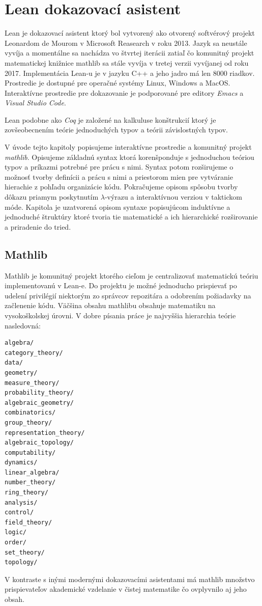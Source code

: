\documentclass[a4paper,10pt,oneside]{report}%
\begin{document}
\chapter{Lean dokazovací asistent}
    Lean je dokazovací asistent ktorý bol vytvorený ako otvorený softvérový projekt
Leonardom de Mourom v Microsoft Reasearch v roku 2013.
    Jazyk sa neustále vyvíja a momentálne sa nachádza vo štvrtej iterácii \cite{lean4}
zatiaľ čo komunitný projekt matematickej knižnice mathlib sa stále vyvíja v tretej
    verzii \cite{lean3} vyvíjanej od roku 2017.
    Implementácia Lean-u je v jazyku C++ a jeho jadro má len 8000 riadkov.
    Prostredie je dostupné pre operačné systémy Linux, Windows a MacOS.
    Interaktívne prostredie pre dokazovanie je podporované pre editory \emph{Emacs} a \emph{Visual Studio Code}.

    Lean podobne ako \emph{Coq} je založené na kalkuluse konštrukcií ktorý je zovšeobecnením 
teórie jednoduchých typov a teórii závislostných typov.

    V úvode tejto kapitoly popisujeme interaktívne prostredie a komunitný projekt
\emph{mathlib}. Opisujeme základnú syntax ktorá korenšponduje s jednoduchou teóriou
typov a príkazmi potrebné pre prácu s nimi. Syntax potom rozširujeme o možnosť
tvorby definícii a prácu s nimi a priestorom mien pre vytváranie hierachie z pohľadu
organizácie kódu.
    Pokračujeme opisom spôsobu tvorby dôkazu priamym poskytnutím $\lambda$-výrazu
a interaktívnou verziou v taktickom móde.
    Kapitola je uzatvorená opisom syntaxe popisujúcom induktívne a jednoduché
štruktúry ktoré tvoria tie matematické a ich hierarchické rozširovanie a priradenie
do tried.

\section{Mathlib}
    Mathlib je komunitný projekt \cite{mathlib} ktorého cieľom je centralizovať
matematickú teóriu implementovanú v Lean-e.
    Do projektu je možné jednoducho prispievať po udelení privilégií niektorým zo
správcov repozitára a odobrením požiadavky na začlenenie kódu.
    Väčšina obsahu mathlibu obsahuje matematiku na vysokoškolskej úrovni.
    V dobre písania práce je najvyššia hierarchia teórie nasledovná:
\begin{lstlisting}
algebra/
category_theory/
data/
geometry/
measure_theory/
probability_theory/
algebraic_geometry/
combinatorics/
group_theory/
representation_theory/
algebraic_topology/
computability/
dynamics/
linear_algebra/
number_theory/
ring_theory/
analysis/
control/
field_theory/
logic/
order/
set_theory/
topology/
\end{lstlisting}
    V kontraste s inými modernými dokazovacími asistentami má mathlib množstvo
prispievateľov akademické vzdelanie v čistej matematike \cite{mathlib_paper} čo
ovplyvnilo aj jeho obsah.
\end{document}
